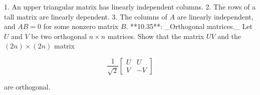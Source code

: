1. An upper triangular matrix has linearly independent columns.
2. The rows of a tall matrix are linearly dependent.
3. The columns of \(A\) are linearly independent, and \(AB=0\) for some nonzero matrix \(B\).
**10.35**: _Orthogonal matrices._ Let \(U\) and \(V\) be two orthogonal \(n\times n\) matrices. Show that the matrix \(UV\) and the \((2n)\times(2n)\) matrix

\[\frac{1}{\sqrt{2}}\left[\begin{array}{cc}U&U\\ V&-V\end{array}\right]\]

are orthogonal.

